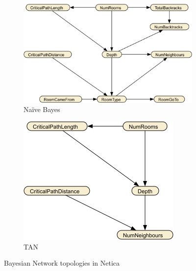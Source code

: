 \documentclass{UoYCSproject}
\begin{document}
\begin{figure}[htb]
  \centering
  \begin{subfigure}[b]{0.55\textwidth}
    \centering
    \includegraphics[width=\textwidth]{SESM_full.png}
    \caption{Na\"{i}ve Bayes}
  \end{subfigure}
  \hfill
  \begin{subfigure}[b]{0.35\textwidth}
    \centering
    \includegraphics[width=\textwidth]{SESM_space.png}
    \caption{TAN}
  \end{subfigure}
  \caption{Bayesian Network topologies in Netica}
  \label{fig:TAN}
\end{figure}
\end{document}
